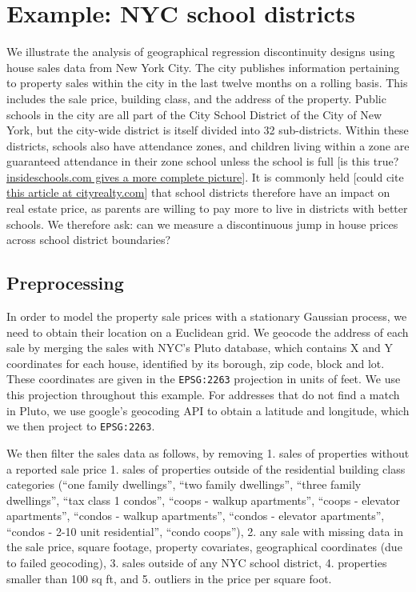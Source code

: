 \documentclass[letter]{article}
\begin{document}
    	\section{Example: NYC school
districts}\label{example-nyc-school-districts}

We illustrate the analysis of geographical regression discontinuity
designs using house sales data from New York City. The city publishes
information pertaining to property sales within the city in the last
twelve months on a rolling basis. This includes the sale price, building
class, and the address of the property. Public schools in the city are
all part of the City School District of the City of New York, but the
city-wide district is itself divided into 32 sub-districts. Within these
districts, schools also have attendance zones, and children living
within a zone are guaranteed attendance in their zone school unless the
school is full {[}is this true?
\href{http://insideschools.org/elementary/how-to-apply}{insideschools.com
gives a more complete picture}{]}. It is commonly held {[}could cite
\href{https://www.cityrealty.com/nyc/market-insight/features/trending-in-ny/buying-renting-school-zone-district-what-you-need-know/3661}{this
article at cityrealty.com}{]} that school districts therefore have an
impact on real estate price, as parents are willing to pay more to live
in districts with better schools. We therefore ask: can we measure a
discontinuous jump in house prices across school district boundaries?
    


    	\subsection{Preprocessing}\label{preprocessing}

In order to model the property sale prices with a stationary Gaussian
process, we need to obtain their location on a Euclidean grid. We
geocode the address of each sale by merging the sales with NYC's Pluto
database, which contains X and Y coordinates for each house, identified
by its borough, zip code, block and lot. These coordinates are given in
the \texttt{EPSG:2263} projection in units of feet. We use this
projection throughout this example. For addresses that do not find a
match in Pluto, we use google's geocoding API to obtain a latitude and
longitude, which we then project to \texttt{EPSG:2263}.

We then filter the sales data as follows, by removing 1. sales of
properties without a reported sale price 1. sales of properties outside
of the residential building class categories (``one family dwellings'',
``two family dwellings'', ``three family dwellings'', ``tax class 1
condos'', ``coops - walkup apartments'', ``coops - elevator
apartments'', ``condos - walkup apartments'', ``condos - elevator
apartments'', ``condos - 2-10 unit residential'', ``condo coops''), 2.
any sale with missing data in the sale price, square footage, property
covariates, geographical coordinates (due to failed geocoding), 3. sales
outside of any NYC school district, 4. properties smaller than 100 sq
ft, and 5. outliers in the price per square foot.
    
\end{document}
